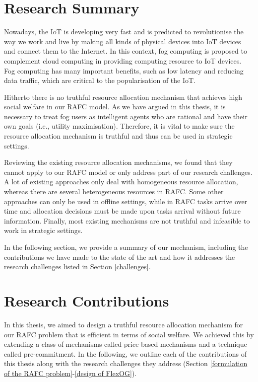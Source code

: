 \documentclass[11pt]{phdthesis}
\begin{document}
\section{Research Summary} \label{research summary}

Nowadays, the IoT is developing very fast and is predicted to revolutionise the way we work and live by making all kinds of physical devices into IoT devices and connect them to the Internet. In this context, fog computing is proposed to complement cloud computing in providing computing resource to IoT devices. Fog computing has many important benefits, such as low latency and reducing data traffic, which are critical to the popularisation of the IoT. 

Hitherto there is no truthful resource allocation mechanism that achieves high social welfare in our RAFC model. As we have argued in this thesis, it is necessary to treat fog users as intelligent agents who are rational and have their own goals (i.e., utility maximisation). Therefore, it is vital to make sure the resource allocation mechanism is truthful and thus can be used in strategic settings. 

Reviewing the existing resource allocation mechanisms, we found that they cannot apply to our RAFC model or only address part of our research challenges. A lot of existing approaches only deal with homogeneous resource allocation, whereas there are several heterogeneous resources in RAFC. Some other approaches can only be used in offline settings, while in RAFC tasks arrive over time and allocation decisions must be made upon tasks arrival without future information. Finally, most existing mechanisms are not truthful and infeasible to work in strategic settings. 

In the following section, we provide a summary of our mechanism, including the contributions we have made to the state of the art and how it addresses the research challenges listed in Section \ref{challenges}. 

\section{Research Contributions} \label{research contributions}

In this thesis, we aimed to design a truthful resource allocation mechanism for our RAFC problem that is efficient in terms of social welfare. We achieved this by extending a class of mechanisms called price-based mechanisms and a technique called pre-commitment. In the following, we outline each of the contributions of this thesis along with the research challenges they address (Section \ref{formulation of the RAFC problem}-\ref{design of FlexOG}). 
\end{document}
